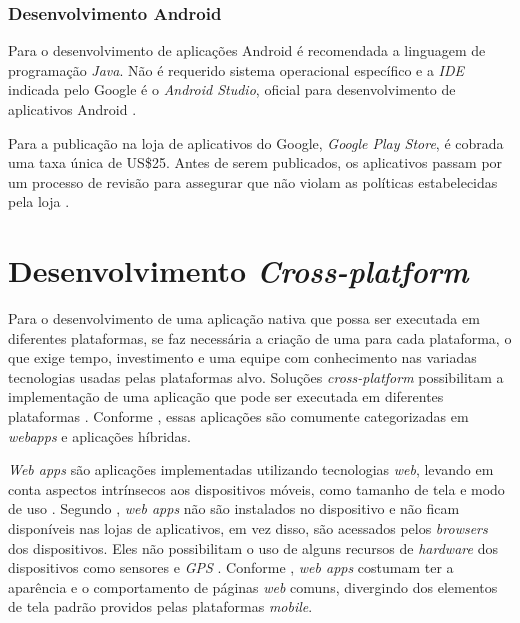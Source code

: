 \begin{itemize}
\end{itemize}

\subsubsection{Desenvolvimento Android} \label{subsection:dev-android}

Para o desenvolvimento de aplicações Android é recomendada a  linguagem de programação \textit{Java}.
Não é requerido sistema operacional específico e a \textit{IDE} indicada pelo Google é o \textit{Android Studio}, oficial para desenvolvimento de aplicativos Android \cite{android_meet_2016}.

Para a publicação na loja de aplicativos do Google, \textit{Google Play Store}, é cobrada uma taxa única de US\$25. 
Antes de serem publicados, os aplicativos passam por um processo de revisão para assegurar que não violam as políticas estabelecidas pela loja \cite{meier_creating_2015}.  

\section{Desenvolvimento \textit{Cross-platform}} \label{section:desenvolvimentomulti}

Para o desenvolvimento de uma aplicação nativa que possa ser executada em diferentes plataformas, se faz necessária a criação de uma para cada plataforma, 
o que exige tempo, investimento e uma equipe com conhecimento nas variadas tecnologias usadas pelas plataformas alvo.
Soluções \textit{cross-platform} possibilitam a implementação de uma aplicação que pode ser executada em diferentes plataformas \cite{kassas_taxonomy_2015}. 
Conforme , essas aplicações são comumente categorizadas em \textit{webapps} e aplicações híbridas.

\textit{Web apps} são aplicações implementadas utilizando tecnologias \textit{web}, levando em conta aspectos intrínsecos aos dispositivos móveis, 
como tamanho de tela e modo de uso \cite{heitkotter_evaluating_2013}. Segundo , \textit{web apps} não são instalados 
no dispositivo e não ficam disponíveis nas lojas de aplicativos, em vez disso, são acessados pelos \textit{browsers} dos dispositivos. Eles 
não possibilitam o uso de alguns recursos de \textit{hardware} dos dispositivos como sensores e \textit{GPS} \cite{heitkotter_evaluating_2013}. 
Conforme , \textit{web apps} costumam ter a aparência e o comportamento de páginas \textit{web} comuns, 
divergindo dos elementos de tela padrão providos pelas plataformas \textit{mobile}.

